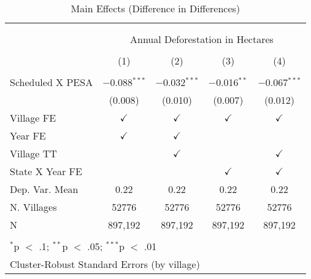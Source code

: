 
\begin{table}[!htbp] \centering 
  \caption{Main Effects (Difference in Differences)} 
  \label{table:regres} 
\begin{tabular}{@{\extracolsep{0pt}}lcccc} 
\\[-1.8ex]\hline \\[-1.8ex] 
\\[-1.8ex] & \multicolumn{4}{c}{Annual Deforestation in Hectares} \\ 
\\[-1.8ex] & (1) & (2) & (3) & (4)\\ 
\hline \\[-1.8ex] 
 Scheduled X PESA & $-$0.088$^{***}$ & $-$0.032$^{***}$ & $-$0.016$^{**}$ & $-$0.067$^{***}$ \\ 
  & (0.008) & (0.010) & (0.007) & (0.012) \\ 
 Village FE & $\checkmark$ & $\checkmark$ & $\checkmark$ & $\checkmark$ \\ 
Year FE & $\checkmark$ & $\checkmark$ &  &  \\ 
Village TT &  & $\checkmark$ &  & $\checkmark$ \\ 
State X Year FE &  &  & $\checkmark$ & $\checkmark$ \\ 
Dep. Var. Mean & 0.22 & 0.22 & 0.22 & 0.22 \\ 
N. Villages & 52776 & 52776 & 52776 & 52776 \\ 
N & 897,192 & 897,192 & 897,192 & 897,192 \\ 
\hline \\[-1.8ex] 
\multicolumn{5}{l}{$^{*}$p $<$ .1; $^{**}$p $<$ .05; $^{***}$p $<$ .01} \\ 
\multicolumn{5}{l}{Cluster-Robust Standard Errors (by village)} \\ 
\end{tabular} 
\end{table} 
